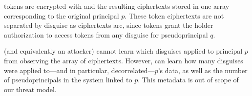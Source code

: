  tokens are encrypted with  and the resulting ciphertexts stored in one array
corresponding to the original principal $p$. These token ciphertexts are not separated by disguise
as  ciphertexts are, since  tokens grant the holder authorization to access
tokens from any disguise for pseudoprincipal $q$.

\sys (and equivalently an attacker) cannot learn which disguises applied to principal $p$ from
observing the array of  ciphertexts. However, \sys can learn how many disguises were
applied to---and in particular, decorrelated---$p$'s data, as well as the number of pseudoprincipals
in the system linked to $p$. This metadata is out of scope of our threat model.
\fi
